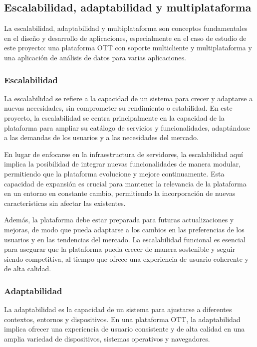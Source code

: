 \subsection{Escalabilidad, adaptabilidad y multiplataforma}
\label{sec:fundamentos_teoricos_esc_adapt}

La escalabilidad, adaptabilidad y multiplataforma son conceptos fundamentales en el diseño y desarrollo de 
aplicaciones, especialmente en el caso de estudio de este proyecto: una plataforma OTT con soporte multicliente 
y multiplataforma y una aplicación de análisis de datos para varias aplicaciones.

\subsubsection{Escalabilidad}
\label{subsec:fundamentos_teoricos_esc_adapt_escalabilidad}

La escalabilidad se refiere a la capacidad de un sistema para crecer y adaptarse a nuevas necesidades, sin 
comprometer su rendimiento o estabilidad. En este proyecto, la escalabilidad se centra principalmente en la 
capacidad de la plataforma para ampliar su catálogo de servicios y funcionalidades, adaptándose a las demandas 
de los usuarios y a las necesidades del mercado.

En lugar de enfocarse en la infraestructura de servidores, la escalabilidad aquí implica la posibilidad de 
integrar nuevas funcionalidades de manera modular, permitiendo que la plataforma evolucione y mejore continuamente. 
Esta capacidad de expansión es crucial para mantener la relevancia de la plataforma en un entorno en constante 
cambio, permitiendo la incorporación de nuevas características sin afectar las existentes.

Además, la plataforma debe estar preparada para futuras actualizaciones y mejoras, de modo que pueda adaptarse 
a los cambios en las preferencias de los usuarios y en las tendencias del mercado. La escalabilidad funcional 
es esencial para asegurar que la plataforma pueda crecer de manera sostenible y seguir siendo competitiva, al 
tiempo que ofrece una experiencia de usuario coherente y de alta calidad.


\subsubsection{Adaptabilidad}
\label{subsec:fundamentos_teoricos_esc_adapt_adaptabilidad}

La adaptabilidad es la capacidad de un sistema para ajustarse a diferentes contextos, entornos y dispositivos. 
En una plataforma OTT, la adaptabilidad implica ofrecer una experiencia de usuario consistente y de alta calidad 
en una amplia variedad de dispositivos, sistemas operativos y navegadores.

